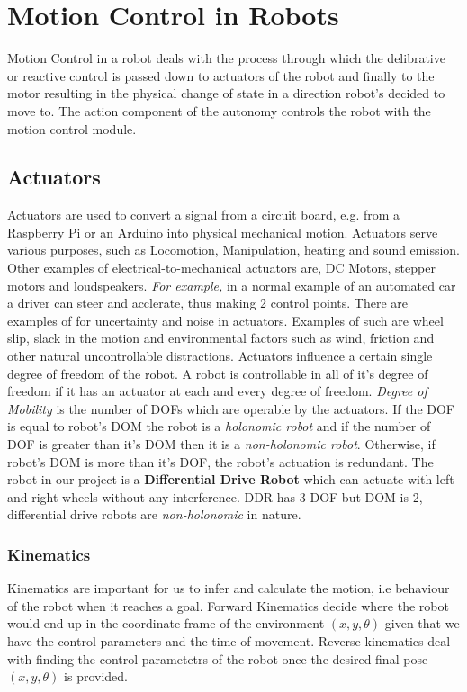 \section{Motion Control in Robots}
Motion Control in a robot deals with the process through which the delibrative or reactive control is passed down to actuators of the robot and finally to the motor resulting in the physical change of state in a direction robot's decided to move to. The action component of the autonomy controls the robot with the motion control module.
\subsection{Actuators}
Actuators are used to convert a signal from a circuit board, e.g. from a Raspberry Pi or an Arduino into physical mechanical motion. Actuators serve various purposes, such as Locomotion, Manipulation, heating and sound emission. 
Other examples of electrical-to-mechanical actuators are, DC Motors, stepper motors and loudspeakers. \textit{For example, } in a normal example of an automated car a driver can steer and acclerate, thus making 2 control points.
There are examples of for uncertainty and noise in actuators. Examples of such are wheel slip, slack in the motion and environmental factors such as wind, friction and other natural uncontrollable distractions. Actuators influence a certain single degree of freedom of the robot.
A robot is controllable in all of it's degree of freedom if it has an actuator at each and every degree of freedom. \textit{Degree of Mobility } is the number of DOFs which are operable by the actuators. If the DOF is equal to robot's DOM the robot is a \textit{holonomic robot} and if the number of DOF is greater than it's DOM then it is a \textit{non-holonomic robot}. Otherwise, if robot's DOM is more than it's DOF, the robot's actuation is redundant.
The robot in our project is a \textbf{Differential Drive Robot} which can actuate with left and right wheels without any interference. DDR has 3 DOF but DOM is 2, differential drive robots are \textit{non-holonomic} in nature.  
\subsubsection{Kinematics}
Kinematics are important for us to infer and calculate the motion, i.e behaviour of the robot when it reaches a goal.
Forward Kinematics decide where the robot would end up in the coordinate frame of the environment $(x,y,\theta)$ given that we have the control parameters and the time of movement. Reverse kinematics deal with finding the control parametetrs of the robot once the desired final pose $(x,y,\theta)$ is provided.

 